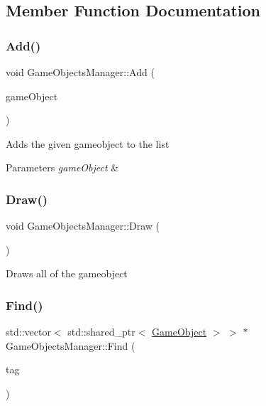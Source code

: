 \subsection{Member Function Documentation}
\mbox{\label{class_game_objects_manager_a20480f2dbcb4607aa74c75e6f4ddccdb}} 
\subsubsection{\texorpdfstring{Add()}{Add()}}
{\footnotesize\ttfamily void Game\+Objects\+Manager\+::\+Add (\begin{DoxyParamCaption}\item[{std\+::shared\+\_\+ptr$<$ \mbox{\hyperlink{class_game_object}{Game\+Object}} $>$}]{game\+Object }\end{DoxyParamCaption})}



Adds the given gameobject to the list 


\begin{DoxyParams}{Parameters}
{\em game\+Object} & \\
\hline
\end{DoxyParams}
\mbox{\label{class_game_objects_manager_a60c1378f98fbef5dc98c8fdd094ef3c9}} 
\subsubsection{\texorpdfstring{Draw()}{Draw()}}
{\footnotesize\ttfamily void Game\+Objects\+Manager\+::\+Draw (\begin{DoxyParamCaption}{ }\end{DoxyParamCaption})}



Draws all of the gameobject 

\mbox{\label{class_game_objects_manager_a0f2728da34f1a966f2b7aa9a35f8e614}} 
\subsubsection{\texorpdfstring{Find()}{Find()}}
{\footnotesize\ttfamily std\+::vector$<$ std\+::shared\+\_\+ptr$<$ \mbox{\hyperlink{class_game_object}{Game\+Object}} $>$ $>$ $\ast$ Game\+Objects\+Manager\+::\+Find (\begin{DoxyParamCaption}\item[{std\+::string}]{tag }\end{DoxyParamCaption})}



